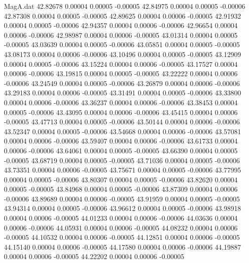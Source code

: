 \begin{filecontents}{MagA.dat}
  42.82678    0.00004    0.00005   -0.00005
  42.84975    0.00004    0.00005   -0.00006
  42.87308    0.00004    0.00005   -0.00005
  42.89625    0.00004    0.00006   -0.00005
  42.91932    0.00004    0.00005   -0.00006
  42.94357    0.00004    0.00006   -0.00006
  42.96654    0.00004    0.00006   -0.00006
  42.98987    0.00004    0.00006   -0.00005
  43.01314    0.00004    0.00005   -0.00005
  43.03639    0.00004    0.00005   -0.00006
  43.05851    0.00004    0.00005   -0.00005
  43.08173    0.00004    0.00006   -0.00006
  43.10496    0.00004    0.00005   -0.00005
  43.12909    0.00004    0.00005   -0.00006
  43.15224    0.00004    0.00006   -0.00005
  43.17527    0.00004    0.00006   -0.00006
  43.19815    0.00004    0.00005   -0.00005
  43.22222    0.00004    0.00006   -0.00006
  43.24549    0.00004    0.00005   -0.00006
  43.26879    0.00004    0.00006   -0.00006
  43.29183    0.00004    0.00006   -0.00005
  43.31491    0.00004    0.00005   -0.00006
  43.33800    0.00004    0.00006   -0.00006
  43.36237    0.00004    0.00006   -0.00006
  43.38453    0.00004    0.00005   -0.00006
  43.43095    0.00004    0.00006   -0.00006
  43.45415    0.00004    0.00006   -0.00005
  43.47713    0.00004    0.00005   -0.00006
  43.50144    0.00004    0.00006   -0.00006
  43.52347    0.00004    0.00005   -0.00006
  43.54668    0.00004    0.00006   -0.00006
  43.57081    0.00004    0.00006   -0.00006
  43.59407    0.00004    0.00006   -0.00006
  43.61733    0.00004    0.00006   -0.00006
  43.64061    0.00004    0.00005   -0.00005
  43.66390    0.00004    0.00005   -0.00005
  43.68719    0.00004    0.00005   -0.00005
  43.71036    0.00004    0.00005   -0.00006
  43.73351    0.00004    0.00006   -0.00005
  43.75671    0.00004    0.00005   -0.00006
  43.77995    0.00004    0.00005   -0.00006
  43.80307    0.00004    0.00005   -0.00006
  43.82620    0.00004    0.00005   -0.00005
  43.84968    0.00004    0.00005   -0.00006
  43.87309    0.00004    0.00006   -0.00006
  43.89689    0.00004    0.00006   -0.00005
  43.91959    0.00004    0.00005   -0.00005
  43.94314    0.00004    0.00005   -0.00006
  43.96612    0.00004    0.00005   -0.00006
  43.98918    0.00004    0.00006   -0.00005
  44.01233    0.00004    0.00006   -0.00006
  44.03636    0.00004    0.00006   -0.00006
  44.05931    0.00004    0.00006   -0.00005
  44.08232    0.00004    0.00006   -0.00005
  44.10532    0.00004    0.00006   -0.00005
  44.12851    0.00004    0.00006   -0.00005
  44.15140    0.00004    0.00006   -0.00005
  44.17580    0.00004    0.00006   -0.00006
  44.19887    0.00004    0.00006   -0.00005
  44.22202    0.00004    0.00006   -0.00005

\end{filecontents}
